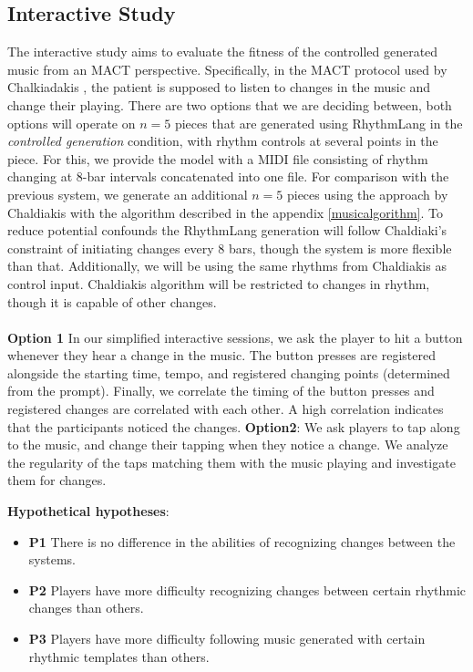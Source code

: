 \subsection{Interactive Study}
The interactive study aims to evaluate the fitness of the controlled generated music from an MACT perspective. Specifically, in the MACT protocol used by Chalkiadakis \cite{Chalkiadakis_2022}, the patient is supposed to listen to changes in the music and change their playing. There are two options that we are deciding between, both options will operate on $n=5$ pieces that are generated using RhythmLang in the \textit{controlled generation} condition, with rhythm controls at several points in the piece. For this, we provide the model with a MIDI file consisting of rhythm changing at 8-bar intervals concatenated into one file.
For comparison with the previous system, we generate an additional $n=5$ pieces using the approach by Chaldiakis\cite{Chalkiadakis_2022} with the algorithm described in the appendix \ref{musicalgorithm}. To reduce potential confounds the RhythmLang generation will follow Chaldiaki's constraint of initiating changes every 8 bars, though the system is more flexible than that. Additionally, we will be using the same rhythms from Chaldiakis as control input. Chaldiakis algorithm will be restricted to changes in rhythm, though it is capable of other changes.\\\\
\textbf{Option 1}
In our simplified interactive sessions, we ask the player to hit a button whenever they hear a change in the music. The button presses are registered alongside the starting time, tempo, and registered changing points (determined from the prompt). Finally, we correlate the timing of the button presses and registered changes are correlated with each other. A high correlation indicates that the participants noticed the changes. 
\textbf{Option2}: We ask players to tap along to the music, and change their tapping when they notice a change. We analyze the regularity of the taps matching them with the music playing and investigate them for changes. 

\textbf{Hypothetical hypotheses}: 
\begin{itemize}
\item \textbf{P1} There is no difference in the abilities of recognizing changes between the systems.
\item \textbf{P2} Players have more difficulty recognizing changes between certain rhythmic changes than others.
\item \textbf{P3} Players have more difficulty following music generated with certain rhythmic templates than others.     
\end{itemize}

